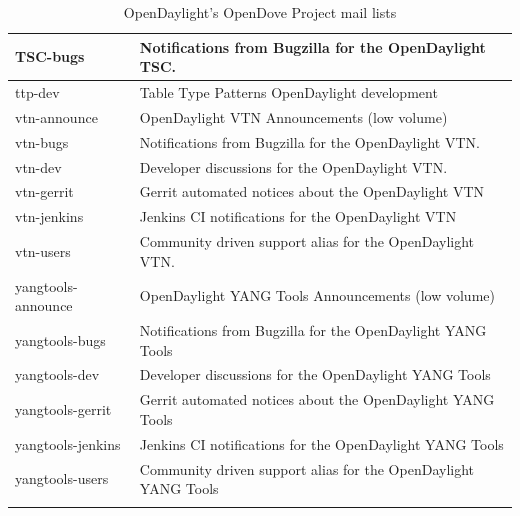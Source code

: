 \documentclass[a4paper, 12pt]{book}
\begin{document}
\begin{longtable}{|p{4cm}|p{10cm}|}
TSC-bugs &	Notifications from Bugzilla for the OpenDaylight TSC. \\ \hline
ttp-dev &	Table Type Patterns OpenDaylight development \\ \hline
vtn-announce &	OpenDaylight VTN Announcements (low volume) \\ \hline
vtn-bugs &	Notifications from Bugzilla for the OpenDaylight VTN. \\ \hline
vtn-dev &	Developer discussions for the OpenDaylight VTN. \\ \hline
vtn-gerrit &	Gerrit automated notices about the OpenDaylight VTN \\ \hline
vtn-jenkins &	Jenkins CI notifications for the OpenDaylight VTN \\ \hline
vtn-users &	Community driven support alias for the OpenDaylight VTN. \\ \hline
yangtools-announce &	OpenDaylight YANG Tools Announcements (low volume) \\ \hline
yangtools-bugs &	Notifications from Bugzilla for the OpenDaylight YANG Tools \\ \hline
yangtools-dev &	Developer discussions for the OpenDaylight YANG Tools \\ \hline
yangtools-gerrit &	Gerrit automated notices about the OpenDaylight YANG Tools \\ \hline
yangtools-jenkins &	Jenkins CI notifications for the OpenDaylight YANG Tools \\ \hline
yangtools-users &	Community driven support alias for the OpenDaylight YANG Tools \\ \hline
\caption{OpenDaylight's OpenDove Project mail lists}
\label{tab:projectmaillist}
\end{longtable}




\label{Bibliography}
\end{document}
